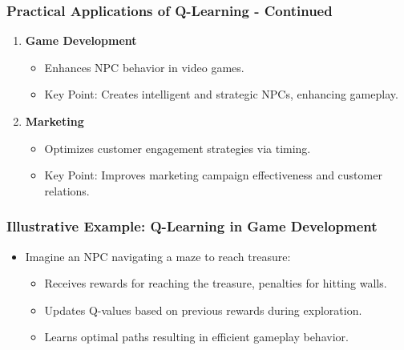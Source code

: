 \documentclass{beamer}
\begin{document}
\begin{frame}[fragile]
    \frametitle{Practical Applications of Q-Learning - Continued}
    \begin{enumerate}[resume]
        \item \textbf{Game Development}
            \begin{itemize}
                \item Enhances NPC behavior in video games.
                \item Key Point: Creates intelligent and strategic NPCs, enhancing gameplay.
            \end{itemize}
        \item \textbf{Marketing}
            \begin{itemize}
                \item Optimizes customer engagement strategies via timing.
                \item Key Point: Improves marketing campaign effectiveness and customer relations.
            \end{itemize}
    \end{enumerate}
\end{frame}

\begin{frame}[fragile]
    \frametitle{Illustrative Example: Q-Learning in Game Development}
    \begin{itemize}
        \item Imagine an NPC navigating a maze to reach treasure:
        \begin{itemize}
            \item Receives rewards for reaching the treasure, penalties for hitting walls.
            \item Updates Q-values based on previous rewards during exploration.
            \item Learns optimal paths resulting in efficient gameplay behavior.
        \end{itemize}
    \end{itemize}
\end{frame}
\end{document}

